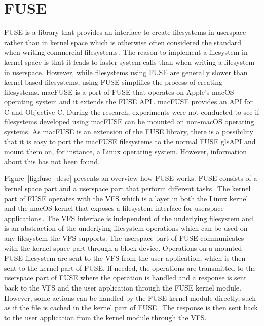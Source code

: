 \section{FUSE}
\gls{FUSE} is a library that provides an interface to create filesystems in userspace rather than in kernel space which is otherwise often considered the standard when writing commercial filesystems\,\cite{Libfuse2021}. The reason to implement a filesystem in kernel space is that it leads to faster system calls than when writing a filesystem in userspace. However, while filesystems using \gls{FUSE} are generally slower than \mbox{kernel-based} filesystems, using \gls{FUSE} simplifies the process of creating filesystems. macFUSE is a port of \gls{FUSE} that operates on Apple's macOS operating system and it extends the \gls{FUSE} \gls{API}\,\cite{HomeMacFUSE}. macFUSE provides an \gls{API} for C and Objective C. During the research, experiments were not conducted to see if filesystems developed using macFUSE can be mounted on \mbox{non-macOS} operating systems. As macFUSE is an extension of the \gls{FUSE} library, there is a possibility that it is easy to port the macFUSE filesystems to the normal \gls{FUSE} gls{API} and mount them on, for instance, a Linux operating system. However, information about this has not been found.

Figure~\ref{fig:fuse_desc} presents an overview how \gls{FUSE} works. \gls{FUSE} consists of a kernel space part and a userspace part that perform different tasks\,\cite{vangoorFUSENotFUSE2017}. The kernel part of \gls{FUSE} operates with the \gls{VFS} which is a layer in both the Linux kernel and the macOS kernel that exposes a filesystem interface for userspace applications\,\cite{goochOverviewLinuxVirtual, singhMacOSInternals2006}. The \gls{VFS} interface is independent of the underlying filesystem and is an abstraction of the underlying filesystem operations which can be used on any filesystem the \gls{VFS} supports. The userspace part of \gls{FUSE} communicates with the kernel space part through a block device. Operations on a mounted \gls{FUSE} filesystem are sent to the \gls{VFS} from the user application, which is then sent to the kernel part of \gls{FUSE}. If needed, the operations are transmitted to the userspace part of \gls{FUSE} where the operation is handled and a response is sent back to the \gls{VFS} and the user application through the \gls{FUSE} kernel module. However, some actions can be handled by the \gls{FUSE} kernel module directly, such as if the file is cached in the kernel part of \gls{FUSE}\,\cite{vangoorFUSENotFUSE2017}. The response is then sent back to the user application from the kernel module through the \gls{VFS}.

